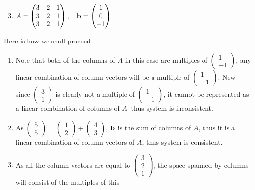 \documentclass[8pt]{article} %
\begin{document}
\begin{description}
{	\begin{enumerate}[label=(\alph*)]
		\setcounter{enumi}{2}
		\item $A=\begin{pmatrix}3&2&1\\3&2&1\\3&2&1\end{pmatrix},\quad\mathbf{b}=\begin{pmatrix}1\\0\\-1\end{pmatrix}$
	\end{enumerate}
	Here is how we shall proceed
	\begin{enumerate}[label=(\alph*)]
			\newcommand{\icv}[1]{$\begin{pmatrix}#1\end{pmatrix}$}
		\item{Note that both of the columns of $A$ in this case are multiples of $\begin{pmatrix}1\\-1\end{pmatrix}$, any linear
			combination of column vectors will be a multiple
			of $\begin{pmatrix}1\\-1\end{pmatrix}$. Now since $\begin{pmatrix}3\\1\end{pmatrix}$ is clearly not
			a multiple of $\begin{pmatrix}1\\-1\end{pmatrix}$, it cannot be represented as a linear combination of 
			columns of $A$, thus system is inconsistent.}
		\item{As $\begin{pmatrix}5\\5\end{pmatrix}=\begin{pmatrix}1\\2\end{pmatrix}+\begin{pmatrix}4\\3\end{pmatrix}$, $\mathbf{b}$ is the
				sum of columns of $A$, thus it is a linear combination of column vectors of $A$, thus system is consistent.}
		\item As all the column vectors are equal to \icv{3\\2\\1}, the space spanned by columns will consist of the multiples of this 

\end{enumerate}}
\end{description}
\end{document}
